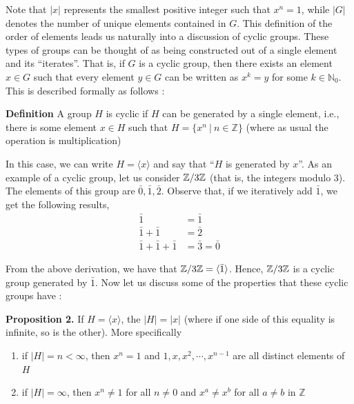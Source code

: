 \documentclass[11pt, reqno]{amsart}
\theoremstyle{plain}
\theoremstyle{definition}
\theoremstyle{example}
\begin{document}
\par
Note that $|x|$ represents the smallest positive integer such that $x^n = 1$, while $|G|$ denotes the number of unique elements contained in $G$. This definition of the order of elements leads us naturally into a discussion of cyclic groups. These types of groups can be thought of as being constructed out of a single element and its ``iterates''. That is, if $G$ is a cyclic group, then there exists an element $x \in G$ such that every element $y \in G$ can be written as $x^k = y$ for some $k \in \mathbb{N}_0$. This is described formally as follows \cite[\S 2.3, p. 54]{dummit}:

\par
\textbf{Definition} A group $H$ is cyclic if $H$ can be generated by a single element, i.e., there is some element $x \in H$ such that $H = \{x^n \ | \ n \in \mathbb{Z}\}$ (where as usual the operation is multiplication)

\par
In this case, we can write $H = \langle x \rangle$ and say that ``$H$ is generated by $x$''. As an example of a cyclic group, let us consider $\mathbb{Z}/3\mathbb{Z}$ (that is, the integers modulo $3$). The elements of this group are $\bar{0}, \bar{1}, \bar{2}$. Observe that, if we iteratively add $\bar{1}$, we get the following results,
\begin{align*}
\bar{1} &= \bar{1}\\
\bar{1} + \bar{1} &= \bar{2}\\
\bar{1} + \bar{1} + \bar{1} &= \bar{3} = \bar{0}
\end{align*}

\par
From the above derivation, we have that $\mathbb{Z}/3\mathbb{Z} = \langle \bar{1} \rangle$. Hence, $\mathbb{Z}/3\mathbb{Z}$ is a cyclic group generated by $\bar{1}$. Now let us discuss some of the properties that these cyclic groups have \cite[\S 2.3, p. 55]{dummit}:

\par
\textbf{Proposition 2.} If $H = \langle x \rangle$, the $|H| = |x|$ (where if one side of this equality is infinite, so is the other). More specifically
\begin{enumerate}
\item if $|H| = n < \infty$, then $x^n = 1$ and $1, x, x^2, \cdots, x^{n-1}$ are all distinct elements of $H$

\item if $|H| = \infty$, then $x^n \neq 1$ for all $n \neq 0$ and $x^a \neq x^b$ for all $a \neq b$ in $\mathbb{Z}$

\end{enumerate}
\end{document}
